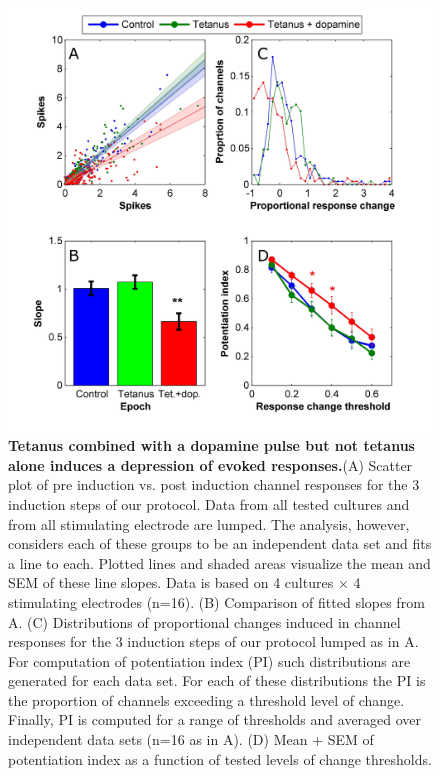         \begin{figure}[!htb]
         \centering
         \includegraphics[width=15cm]{chapter3/figures/tetResChangeStats/tetResChangeStats.jpg}

         \caption[Statistics of changes to evoked responses in the combined dopamine and tetanus plasticity induction experiment]{\textbf{Tetanus combined with a dopamine pulse but not tetanus alone induces a depression of evoked responses.}(A) Scatter plot of pre induction vs. post induction channel responses for the 3 induction steps of our protocol. Data from all tested cultures and from all stimulating electrode are lumped. The analysis, however, considers each of these groups to be an independent data set and fits a line to each. Plotted lines and shaded areas visualize the mean and SEM of these line slopes. Data is based on 4 cultures \(\times\) 4 stimulating electrodes (n=16). (B) Comparison of fitted slopes from A. (C) Distributions of proportional changes induced in channel responses for the 3 induction steps of our protocol lumped as in A. For computation of potentiation index (PI) such distributions are generated for each data set. For each of these distributions the PI is the proportion of channels exceeding a threshold level of change. Finally, PI is computed for a range of thresholds and averaged over independent data sets (n=16 as in A). (D) Mean + SEM of potentiation index as a function of tested levels of change thresholds.}
         \label{fig:activity:tetResChange}
    \end{figure}


